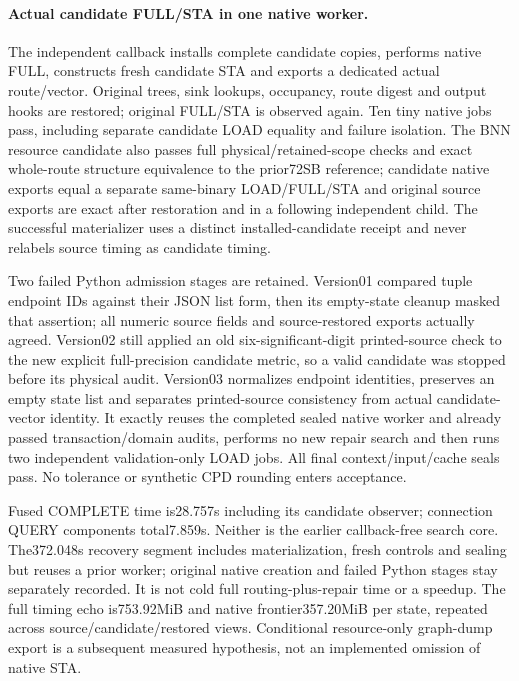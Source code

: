 \paragraph{Actual candidate FULL/STA in one native worker.}
The independent callback installs complete candidate copies, performs native FULL, constructs fresh candidate STA and exports a dedicated actual route/vector. Original trees, sink lookups, occupancy, route digest and output hooks are restored; original FULL/STA is observed again. Ten tiny native jobs pass, including separate candidate LOAD equality and failure isolation. The BNN resource candidate also passes full physical/retained-scope checks and exact whole-route structure equivalence to the prior72SB reference; candidate native exports equal a separate same-binary LOAD/FULL/STA and original source exports are exact after restoration and in a following independent child. The successful materializer uses a distinct installed-candidate receipt and never relabels source timing as candidate timing.

Two failed Python admission stages are retained. Version01 compared tuple endpoint IDs against their JSON list form, then its empty-state cleanup masked that assertion; all numeric source fields and source-restored exports actually agreed. Version02 still applied an old six-significant-digit printed-source check to the new explicit full-precision candidate metric, so a valid candidate was stopped before its physical audit. Version03 normalizes endpoint identities, preserves an empty state list and separates printed-source consistency from actual candidate-vector identity. It exactly reuses the completed sealed native worker and already passed transaction/domain audits, performs no new repair search and then runs two independent validation-only LOAD jobs. All final context/input/cache seals pass. No tolerance or synthetic CPD rounding enters acceptance.

Fused COMPLETE time is28.757s including its candidate observer; connection QUERY components total7.859s. Neither is the earlier callback-free search core. The372.048s recovery segment includes materialization, fresh controls and sealing but reuses a prior worker; original native creation and failed Python stages stay separately recorded. It is not cold full routing-plus-repair time or a speedup. The full timing echo is753.92MiB and native frontier357.20MiB per state, repeated across source/candidate/restored views. Conditional resource-only graph-dump export is a subsequent measured hypothesis, not an implemented omission of native STA.

